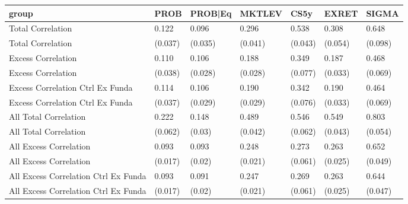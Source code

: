 
\begin{tabular}{l|l|l|l|l|l|l}
\hline
group & PROB & PROB|Eq & MKTLEV & CS5y & EXRET & SIGMA\\
\hline
Total Correlation & 0.122 & 0.096 & 0.296 & 0.538 & 0.308 & 0.648\\
Total Correlation & (0.037) & (0.035) & (0.041) & (0.043) & (0.054) & (0.098)\\
Excess Correlation & 0.110 & 0.106 & 0.188 & 0.349 & 0.187 & 0.468\\
Excess Correlation & (0.038) & (0.028) & (0.028) & (0.077) & (0.033) & (0.069)\\
Excess Correlation Ctrl Ex Funda & 0.114 & 0.106 & 0.190 & 0.342 & 0.190 & 0.464\\
Excess Correlation Ctrl Ex Funda & (0.037) & (0.029) & (0.029) & (0.076) & (0.033) & (0.069)\\
All Total Correlation & 0.222 & 0.148 & 0.489 & 0.546 & 0.549 & 0.803\\
All Total Correlation & (0.062) & (0.03) & (0.042) & (0.062) & (0.043) & (0.054)\\
All Excess Correlation & 0.093 & 0.093 & 0.248 & 0.273 & 0.263 & 0.652\\
All Excess Correlation & (0.017) & (0.02) & (0.021) & (0.061) & (0.025) & (0.049)\\
All Excess Correlation Ctrl Ex Funda & 0.093 & 0.091 & 0.247 & 0.269 & 0.263 & 0.644\\
All Excess Correlation Ctrl Ex Funda & (0.017) & (0.02) & (0.021) & (0.061) & (0.025) & (0.047)\\
\hline
\end{tabular}
